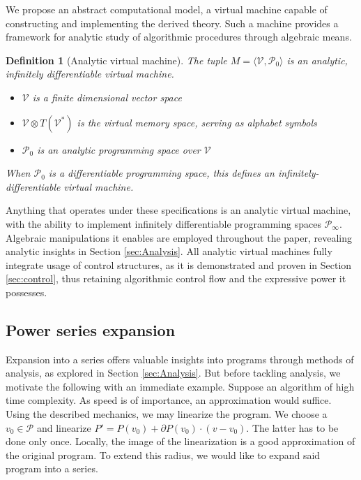 \documentclass{article}
\newcommand{\VV}{\mathcal{V}}
\newcommand{\dP}{\mathcal{P}}
\newcommand{\D}{\partial}
\newtheorem{definicija}{Definition}[section]
\begin{document}
We propose an abstract computational model, a virtual machine capable of constructing and implementing the derived theory. Such a machine provides a framework for analytic study of algorithmic procedures through algebraic means.

\begin{definicija}[Analytic virtual machine]
The tuple $M=\langle \VV,\dP_0\rangle$ is an analytic, infinitely  differentiable virtual machine.
   
    \begin{itemize}
    \item
    $\VV$ is a finite dimensional vector space
    \item
    $\VV\otimes T(\VV^*)$ is the virtual memory space, serving as alphabet symbols
    \item
    $\dP_0$ is an analytic programming space over $\VV$
    \end{itemize}
    When $\dP_0$ is a differentiable programming space, this defines an infinitely-differentiable virtual machine.
  \end{definicija}
Anything that operates under these specifications is an analytic virtual machine, with the ability to implement infinitely differentiable programming spaces $\dP_\infty$. Algebraic manipulations it enables are employed throughout the paper, revealing analytic insights in Section \ref{sec:Analysis}.  All analytic virtual machines fully integrate usage of control structures, as it is demonstrated and proven in Section \ref{sec:control}, thus retaining algorithmic control flow and the expressive power it possesses. 

 \subsection{Power series expansion}\label{sec:Vrsta}
 
 Expansion into a series offers valuable insights into programs through methods of analysis, as explored in Section \ref{sec:Analysis}. But before tackling analysis, we motivate the following with an immediate example. Suppose an algorithm of high time complexity. As speed is of importance, an approximation would suffice. Using the described mechanics, we may linearize the program. We choose a $v_0\in\dP$ and linearize $P'=P(v_0)+\D P(v_0)\cdot(v-v_0)$. The latter has to be done only once.
 Locally, the image of the linearization is a good approximation of the original program. To extend this radius, we would like to expand said program into a series.
 
\end{document}
